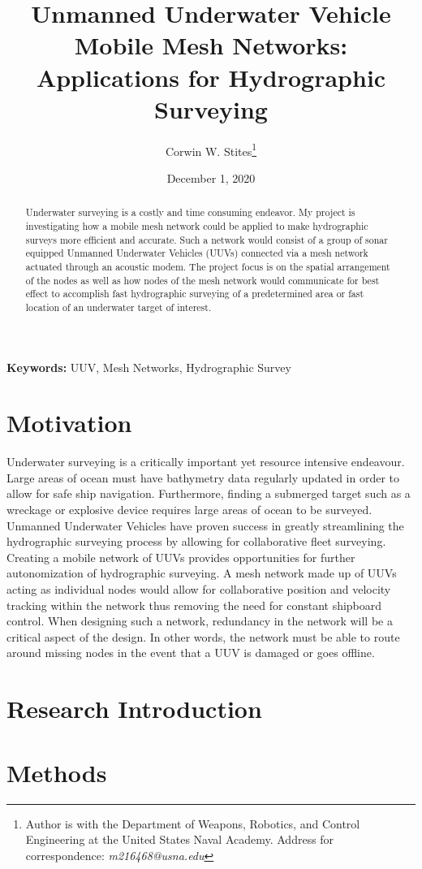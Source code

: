 \documentclass[10pt]{article}
\title{Unmanned Underwater Vehicle Mobile Mesh Networks: Applications for Hydrographic Surveying}
\author{Corwin W. Stites\thanks{Author is with the Department of Weapons, Robotics, and Control Engineering at the United States Naval Academy. Address for correspondence: \emph{m216468@usna.edu}}}
\date{December 1, 2020}
\begin{document}
\maketitle

\begin{abstract}
	Underwater surveying is a costly and time consuming endeavor. My project is investigating how a mobile mesh network could be applied to make hydrographic surveys more efficient and accurate. Such a network would consist of a group of sonar equipped Unmanned Underwater Vehicles (UUVs) connected via a mesh network actuated through an acoustic modem. The project focus is on the spatial arrangement of the nodes as well as how nodes of the mesh network would communicate for best effect to accomplish fast hydrographic surveying of a predetermined area or fast location of an underwater target of interest.  
\end{abstract}

{\scriptsize\textbf{Keywords: } UUV, Mesh Networks, Hydrographic Survey}

\section{Motivation}
Underwater surveying is a critically important yet resource intensive endeavour. Large areas of ocean must have bathymetry data regularly updated in order to allow for safe ship navigation. Furthermore, finding a submerged target such as a wreckage or explosive device  requires large areas of ocean to be surveyed. Unmanned Underwater Vehicles have proven success in greatly streamlining the hydrographic surveying process by allowing for collaborative fleet surveying. Creating a mobile network of UUVs provides opportunities for further autonomization of hydrographic surveying.  A mesh network made up of UUVs acting as individual nodes would allow for collaborative position and velocity tracking within the network thus removing the need for constant shipboard control. When designing such a network, redundancy in the network will be a critical aspect of the design. In other words, the network must be able to route around missing nodes in the event that a UUV is damaged or goes offline.


\section{Research Introduction}

\section{Methods}
\end{document}

